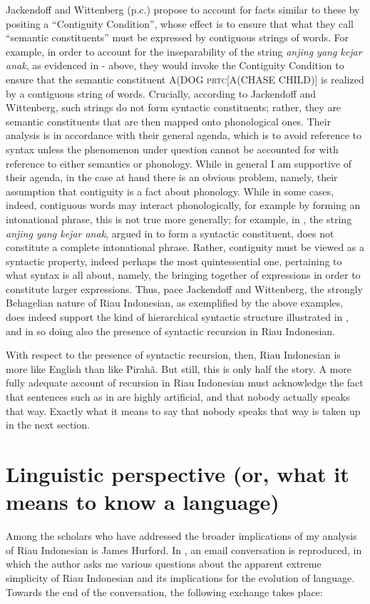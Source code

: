 \documentclass[output=paper,colorlinks,citecolor=brown
]{langscibook}
\begin{document}
Jackendoff and Wittenberg (p.c.) propose to account for facts similar to these by positing a ``Contiguity Condition'', whose effect is to ensure that what they call ``semantic constituents'' must be expressed by contiguous strings of words.  For example, in order to account for the inseparability of the string \textit{anjing yang kejar anak}, as evidenced in  -  above, they would invoke the Contiguity Condition to ensure that the semantic constituent A(DOG \textsc{prtc}[A(CHASE CHILD)] is realized by a contiguous string of words.  Crucially, according to Jackendoff and Wittenberg, such strings do not form syntactic constituents; rather, they are semantic constituents that are then mapped onto phonological ones.  Their analysis is in accordance with their general agenda, which is to avoid reference to syntax unless the phenomenon under question cannot be accounted for with reference to either semantics or phonology.  While in general I am supportive of their agenda, in the case at hand there is an obvious problem, namely, their assumption that contiguity is a fact about phonology.  While in some cases, indeed, contiguous words may interact phonologically, for example by forming an intonational phrase, this is not true more generally; for example, in , the string \textit{anjing yang kejar anak}, argued in  to form a syntactic constituent, does not constitute a complete intonational phrase.  Rather, contiguity must be viewed as a syntactic property, indeed perhaps the most quintessential one, pertaining to what syntax is all about, namely, the bringing together of expressions in order to constitute larger expressions.  Thus, pace Jackendoff and Wittenberg, the strongly Behagelian nature of Riau Indonesian, as exemplified by the above examples, does indeed support the kind of hierarchical syntactic structure illustrated in , and in so doing also the presence of syntactic recursion in Riau Indonesian.

With respect to the presence of syntactic recursion, then, Riau Indonesian is more like English than like Pirahã.  But still, this is only half the story.  A more fully adequate account of recursion in Riau Indonesian must acknowledge the fact that sentences such as in  are highly artificial, and that nobody actually speaks that way.  Exactly what it means to say that nobody speaks that way is taken up in the next section.

\section{Linguistic perspective (or, what it means to know a language)}
Among the scholars who have addressed the broader implications of my analysis of Riau Indonesian is James Hurford. In \citet[410--413]{hurford2011origins}, an email conversation is reproduced, in which the author asks me various questions about the apparent extreme simplicity of Riau Indonesian and its implications for the evolution of language.  Towards the end of the conversation, the following exchange takes place:
\end{document}
